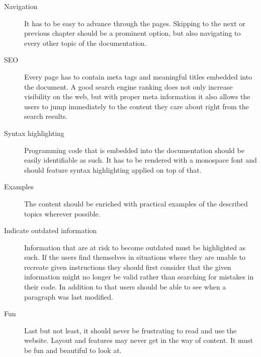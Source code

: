 \begin{description}
	\item[Navigation]\hfill

	It has to be easy to advance through the pages. Skipping to the next or previous chapter should be a prominent option, but also navigating to every other topic of the documentation.

	\item[SEO]\hfill

	Every page has to contain meta tags and meaningful titles embedded into the document. A good search engine ranking does not only increase visibility on the web, but with proper meta information it also allows the users to jump immediately to the content they care about right from the search results.

	\item[Syntax highlighting]\hfill

	Programming code that is embedded into the documentation should be easily identifiable as such. It has to be rendered with a monospace font and should feature syntax highlighting applied on top of that.

	\item[Examples]\hfill

	The content should be enriched with practical examples of the described topics wherever possible.

	\item[Indicate outdated information]\hfill

	Information that are at risk to become outdated must be highlighted as such. If the users find themselves in situations where they are unable to recreate given instructions they should first consider that the given information might no longer be valid rather than searching for mistakes in their code. In addition to that users should be able to see when a paragraph was last modified.

	\item[Fun]\hfill

	Last but not least, it should never be frustrating to read and use the website. Layout and features may never get in the way of content. It must be fun and beautiful to look at.

\end{description}
